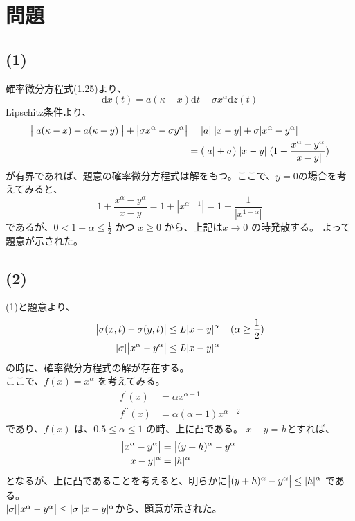 \documentclass[a4j,10pt,oneside,openany]{jsbook}
\newcommand{\diff}{\mathrm{d}}  %
\begin{document}
\section*{問題 }
\subsection*{(1)}
確率微分方程式(1.25)より、
\[ {\diff}x(t) = a(\kappa - x) {\diff}t + \sigma x^{\alpha} {\diff}z(t) \]
Lipschitz条件より、
\begin{align*}
\bigl{|} \; a(\kappa - x) - a(\kappa - y) \; \bigr{|} + \bigl{|} \sigma x^{\alpha} - \sigma y^{\alpha}  \bigr{|}
			&= |a|\;|x-y| + \sigma |x^{\alpha} - y^{\alpha}| \\
			&= (|a|+\sigma) \; |x-y| \; (1 + \frac{x^{\alpha} - y^{\alpha}}{|x-y|})
\end{align*}
が有界であれば、題意の確率微分方程式は解をもつ。ここで、$y=0$の場合を考えてみると、\\
\[ 1 + \frac{x^{\alpha} - y^{\alpha}}{|x-y|} = 1 + |x^{\alpha - 1}| = 1 + \frac{1}{|x^{1 - \alpha}|} \]
であるが、$0 < 1 - \alpha \leq \frac{1}{2}$ かつ $ x \geq 0 $ から、上記は$x \to 0$ の時発散する。
よって題意が示された。

\subsection*{(2)}
(1)と題意より、
\begin{align*}
\bigl{|} \sigma (x, t) - \sigma (y, t) \bigr{|} &\leq L | x -y |^\alpha \;\;\;\;  ( \alpha \geq \frac{1}{2}) \\
| \sigma | \bigl{|} x^{\alpha} - y^{\alpha} \bigr{|} &\leq L | x -y |^\alpha
\end{align*}
の時に、確率微分方程式の解が存在する。\\
ここで、$ f(x) = x^{\alpha} $ を考えてみる。
\begin{align*}
f^{\prime} (x) &= \alpha x^{\alpha - 1} \\
f^{\prime \prime} (x) &= \alpha ( \alpha - 1 ) x^{\alpha - 2}
\end{align*}
であり、$f(x)$ は、$ 0.5 \leq \alpha \leq 1 $ の時、上に凸である。
$ x - y = h $とすれば、
\begin{align*}
\bigl{|} x^{\alpha} - y^{\alpha} \bigr{|} &= \bigl{|} (y + h)^{\alpha} - y^{\alpha} \bigr{|} \\
| x -y |^\alpha &= |h|^{\alpha}
\end{align*}
となるが、上に凸であることを考えると、明らかに$ \bigl{|} (y + h)^{\alpha} - y^{\alpha} \bigr{|} \leq |h|^{\alpha} $ である。\\
$ |\sigma| \bigl{|} x^{\alpha} - y^{\alpha} \bigr{|} \leq |\sigma| |x - y|^{\alpha} $から、題意が示された。
\vspace{2\baselineskip}
\end{document}
